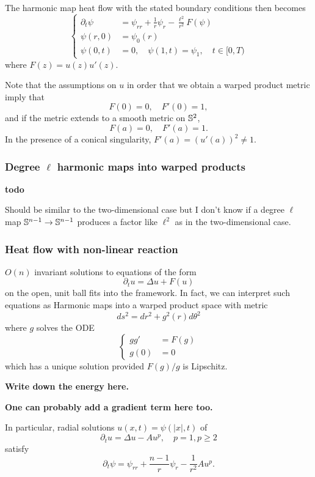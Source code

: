 \documentclass{amsart}
\begin{document}
The harmonic map heat flow with the stated boundary conditions then becomes
\begin{equation}
\label{eq:harmonic_map_heat_flow}
\begin{cases}
\partial_t \psi &= \psi_{rr} + \frac{1}{r} \psi_r - \frac{\ell^2}{r^2} F(\psi) \\
\psi(r, 0) &= \psi_0(r) \\
\psi(0, t) &= 0, \quad \psi(1, t) = \psi_1, \quad t \in [0, T)
\end{cases}
\end{equation}
where \(F(z) = u(z)u'(z)\).

Note that the assumptions on \(u\) in order that we obtain a warped product metric imply that
\[
F(0) = 0, \quad F'(0) = 1,
\]
and if the metric extends to a smooth metric on \(\S^2\),
\[
F(a) = 0, \quad F'(a) = 1.
\]
In the presence of a conical singularity, \(F'(a) = (u'(a))^2 \ne 1\).

\subsubsection*{Degree \(\ell\) harmonic maps into warped products}

\textbf{todo}

Should be similar to the two-dimensional case but I don't know if a degree \(\ell\) map \(\S^{n-1} \to \S^{n-1}\) produces a factor like \(\ell^2\) as in the two-dimensional case.

\subsubsection*{Heat flow with non-linear reaction}

\(O(n)\) invariant solutions to equations of the form
\[
\partial_t u = \Delta u + F(u)
\]
on the open, unit ball fits into the framework. In fact, we can interpret such equations as Harmonic maps into a warped product space with metric
\[
ds^2 = dr^2 + g^2(r) d\theta^2
\]
where \(g\) solves the ODE
\[
\begin{cases}
gg' &= F(g) \\
g(0) &= 0
\end{cases}
\]
which has a unique solution provided \(F(g)/g\) is Lipschitz.

\textbf{Write down the energy here.}

\textbf{One can probably add a gradient term here too.}

In particular, radial solutions \(u(x, t) = \psi(|x|, t)\) of
\[
\partial_t u = \Delta u - A u^p, \quad p = 1, p \geq 2
\]
satisfy
\[
\partial_t \psi = \psi_{rr} + \frac{n-1}{r} \psi_r - \frac{1}{r^2} A u^p.
\]
\end{document}
